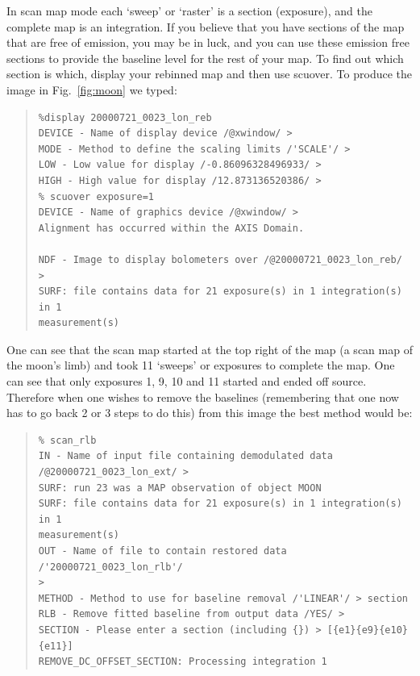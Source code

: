 \documentclass[twoside,11pt]{article}
\newenvironment{myquote}{\begin{quote}\begin{small}}{\end{small}\end{quote}}
\newcommand{\task}[1]{\textsf{#1}}
\newcommand{\scuover}{\xref{\task{scuover}}{sun216}{SCUOVER}}
\newcommand{\xref}[3]{#1}
\renewcommand{\_}{\texttt{\symbol{95}}}
\begin{document}
In scan map mode each `sweep' or `raster' is a section (exposure), and
the complete map is an integration. If you believe that you have
sections of the map that are free of emission, you may be in luck, and
you can use these emission free sections to provide the baseline level
for the rest of your map. To find out which section is which, display
your rebinned map and then use \scuover. To produce the image in Fig.\
\ref{fig:moon} we typed:

\begin{myquote}
\begin{verbatim}
%display 20000721_0023_lon_reb
DEVICE - Name of display device /@xwindow/ > 
MODE - Method to define the scaling limits /'SCALE'/ > 
LOW - Low value for display /-0.86096328496933/ > 
HIGH - High value for display /12.873136520386/ >
% scuover exposure=1
DEVICE - Name of graphics device /@xwindow/ > 
Alignment has occurred within the AXIS Domain.

NDF - Image to display bolometers over /@20000721_0023_lon_reb/ > 
SURF: file contains data for 21 exposure(s) in 1 integration(s) in 1
measurement(s)
\end{verbatim}
\end{myquote}

One can see that the scan map started at the top right of the map (a
scan map of the moon's limb) and took 11 `sweeps' or exposures to
complete the map.  One can see that only exposures 1, 9, 10 and 11
started and ended off source.  Therefore when one wishes to remove the
baselines (remembering that one now has to go back 2 or 3 steps to do
this) from this image the best method would be:

\begin{myquote}
\begin{verbatim}
% scan_rlb
IN - Name of input file containing demodulated data 
/@20000721_0023_lon_ext/ > 
SURF: run 23 was a MAP observation of object MOON
SURF: file contains data for 21 exposure(s) in 1 integration(s) in 1
measurement(s)
OUT - Name of file to contain restored data /'20000721_0023_lon_rlb'/ 
> 
METHOD - Method to use for baseline removal /'LINEAR'/ > section
RLB - Remove fitted baseline from output data /YES/ > 
SECTION - Please enter a section (including {}) > [{e1}{e9}{e10}{e11}]
REMOVE_DC_OFFSET_SECTION: Processing integration 1
\end{verbatim}
\end{myquote}
\end{document}
